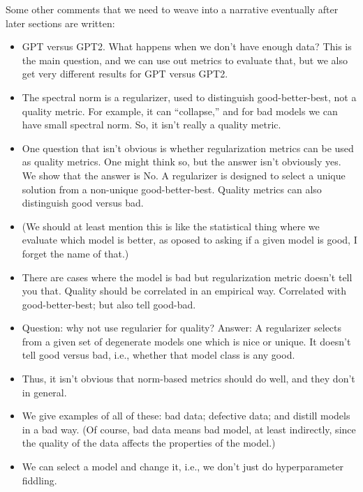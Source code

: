 Some other comments that we need to weave into a narrative eventually after later sections are written:
\begin{itemize}
\item
GPT versus GPT2.
What happens when we don't have enough data?
This is the main question, and we can use out metrics to evaluate that, but we also get very different results for GPT versus GPT2.
\item
The spectral norm is a regularizer, used to distinguish good-better-best, not a quality metric.
For example, it can ``collapse,'' and for bad models we can have small spectral norm.
So, it isn't really a quality metric.
\item
One question that isn't obvious is whether regularization metrics can be used as quality metrics.
One might think so, but the answer isn't obviously yes.
We show that the answer is No.
A regularizer is designed to select a unique solution from a non-unique good-better-best.
Quality metrics can also distinguish good versus bad.
\item
(We should at least mention this is like the statistical thing where we evaluate which model is better, as oposed to asking if a given model is good, I forget the name of that.)
\item
There are cases where the model is bad but regularization metric doesn't tell you that.
Quality should be correlated in an empirical way.
Correlated with good-better-best; but also tell good-bad.
\item
Question: why not use regularier for quality?
Answer: A regularizer selects from a given set of degenerate models one which is nice or unique.
It doesn't tell good versus bad, i.e., whether that model class is any good.
\item
Thus, it isn't obvious that norm-based metrics should do well, and they don't in general.
\item
We give examples of all of these: bad data; defective data; and distill models in a bad way.
(Of course, bad data means bad model, at least indirectly, since the quality of the data affects the properties of the model.)
\item
We can select a model and change it, i.e., we don't just do hyperparameter fiddling.
\end{itemize}

